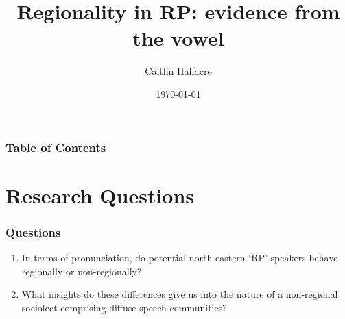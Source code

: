 \documentclass[
xcolor=table,
PHONON=true]
{beamer}
\title{Regionality in RP: evidence from the \goat vowel}
\author{Caitlin Halfacre}
\institute{Newcastle University}
\date{\today}
\begin{document}
	\frame[plain]{\titlepage}
	\begin{frame}
		\frametitle{Table of Contents}
		\tableofcontents{}
	\end{frame}
	
\section{Research Questions}

	\begin{frame}
		\frametitle{Questions}
		\begin{enumerate}
			\item In terms of pronunciation, do potential north-eastern ‘RP’ speakers behave regionally or non-regionally?
			\item What insights do these differences give us into the nature of a non-regional sociolect comprising diffuse speech communities?
		\end{enumerate}
	\end{frame}
\end{document}
